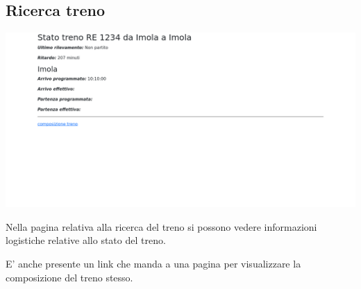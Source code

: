 \documentclass[a4paper,12pt]{report}
\begin{document}
	\subsection{Ricerca treno}
	\includegraphics[width=\linewidth]{res/screenshots/stato_treno.png}
	\par Nella pagina relativa alla ricerca del treno si possono vedere informazioni logistiche relative allo stato del treno.
	\par E' anche presente un link che manda a una pagina per visualizzare la composizione del treno stesso.
\end{document}
